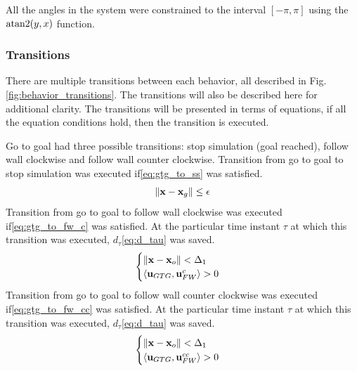 All the angles in the system were constrained to the interval $[-\pi, \pi]$ using the $\operatorname{atan2}(y,x)$ function.




\subsubsection{Transitions}
There are multiple transitions between each behavior, all described in Fig.\:\ref{fig:behavior_transitions}. The transitions will also be described here for additional clarity. The transitions will be presented in terms of equations, if all the equation conditions hold, then the transition is executed.

Go to goal had three possible transitions: stop simulation (goal reached), follow wall clockwise and follow wall counter clockwise.
Transition from go to goal to stop simulation was executed if\:\eqref{eq:gtg_to_ss} was satisfied.
\begin{equation}
    \label{eq:gtg_to_ss}
    \left\lVert \mathbf{x} - \mathbf{x}_g \right\rVert \le \epsilon
\end{equation}
Transition from go to goal to follow wall clockwise was executed if\:\eqref{eq:gtg_to_fw_c} was satisfied. At the particular time instant $\tau$ at which this transition was executed, $d_{\tau}$\:\eqref{eq:d_tau} was saved.
\begin{equation}
    \label{eq:gtg_to_fw_c}
    \begin{cases}
         \left\lVert \mathbf{x} - \mathbf{x}_o \right\rVert < \Delta_1 \\
         \langle \mathbf{u}_{GTG} , \mathbf{u}_{FW}^{c} \rangle > 0
    \end{cases}
\end{equation}
Transition from go to goal to follow wall counter clockwise was executed if\:\eqref{eq:gtg_to_fw_cc} was satisfied. At the particular time instant $\tau$ at which this transition was executed, $d_{\tau}$\:\eqref{eq:d_tau} was saved.
\begin{equation}
    \label{eq:gtg_to_fw_cc}
    \begin{cases}
         \left\lVert \mathbf{x} - \mathbf{x}_o \right\rVert < \Delta_1 \\
         \langle \mathbf{u}_{GTG} , \mathbf{u}_{FW}^{cc} \rangle > 0
    \end{cases}
\end{equation}

